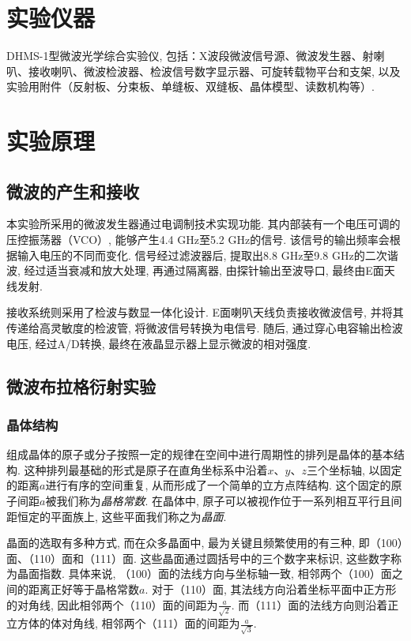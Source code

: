 \documentclass[zihao=5, UTF8]{article}
\theoremstyle{MyLineTheoremStyle} %
\theoremstyle{MyBlockTheoremStyle} %
\theoremstyle{MySubsubsectionStyle} %
\begin{document}
\section{实验仪器}
DHMS-1型微波光学综合实验仪, 包括：X波段微波信号源、微波发生器、射喇叭、接收喇叭、微波检波器、检波信号数字显示器、可旋转载物平台和支架, 以及实验用附件（反射板、分束板、单缝板、双缝板、晶体模型、读数机构等）. 
\section{实验原理}
\subsection{微波的产生和接收}
本实验所采用的微波发生器通过电调制技术实现功能. 其内部装有一个电压可调的压控振荡器（VCO）, 能够产生4.4 GHz至5.2 GHz的信号. 该信号的输出频率会根据输入电压的不同而变化. 信号经过滤波器后, 提取出8.8 GHz至9.8 GHz的二次谐波, 经过适当衰减和放大处理, 再通过隔离器, 由探针输出至波导口, 最终由E面天线发射. 

接收系统则采用了检波与数显一体化设计. E面喇叭天线负责接收微波信号, 并将其传递给高灵敏度的检波管, 将微波信号转换为电信号. 随后, 通过穿心电容输出检波电压, 经过A/D转换, 最终在液晶显示器上显示微波的相对强度. 

\subsection{微波布拉格衍射实验}
\subsubsection{晶体结构}    

组成晶体的原子或分子按照一定的规律在空间中进行周期性的排列是晶体的基本结构. 这种排列最基础的形式是原子在直角坐标系中沿着$x$、$y$、$z$三个坐标轴, 以固定的距离$a$进行有序的空间重复, 从而形成了一个简单的立方点阵结构. 这个固定的原子间距$a$被我们称为\textit{晶格常数}. 在晶体中, 原子可以被视作位于一系列相互平行且间距恒定的平面族上, 这些平面我们称之为\textit{晶面}. 

晶面的选取有多种方式, 而在众多晶面中, 最为关键且频繁使用的有三种, 即（100）面、（110）面和（111）面. 这些晶面通过圆括号中的三个数字来标识, 这些数字称为晶面指数. 具体来说, （100）面的法线方向与坐标轴一致, 相邻两个（100）面之间的距离正好等于晶格常数$a$. 对于（110）面, 其法线方向沿着坐标平面中正方形的对角线, 因此相邻两个（110）面的间距为$\frac{a}{\sqrt{2}}$. 而（111）面的法线方向则沿着正立方体的体对角线, 相邻两个（111）面的间距为$\frac{a}{\sqrt{3}}$. 
\end{document}
